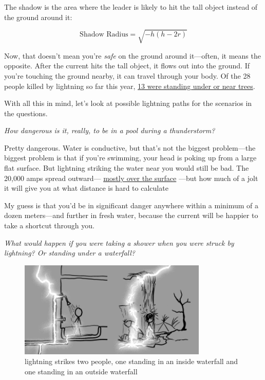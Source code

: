 {The shadow is the area where the leader is likely to hit the tall object instead of the ground around it:}

{\[\text{Shadow Radius}=\sqrt{-h(h-2r)}\]}

{Now, that doesn’t mean you’re \emph{safe} on the ground around it—often, it means the opposite. After the current hits the tall object, it flows out into the ground. If you’re touching the ground nearby, it can travel through your body. Of the 28 people killed by lightning so far this year, \href{http://www.lightningsafety.noaa.gov/fatalities.htm}{13 were standing under or near trees}.}

{With all this in mind, let’s look at possible lightning paths for the scenarios in the questions.}

{ \emph{How dangerous is it, really, to be in a pool during a thunderstorm?} }

{Pretty dangerous. Water is conductive, but that’s not the biggest problem—the biggest problem is that if you’re swimming, your head is poking up from a large flat surface. But lightning striking the water near you would still be bad. The 20,000 amps spread outward— \href{http://www.pbs.org/wgbh/nova/earth/dwyer-lightning.html}{mostly over the surface} —but how much of a jolt it will give you at what distance is hard to calculate}

{My guess is that you’d be in significant danger anywhere within a minimum of a dozen meters—and further in fresh water, because the current will be happier to take a shortcut through you.}

{ \emph{What would happen if you were taking a shower when you were struck by lightning? Or standing under a waterfall?} }

\begin{figure}[!htbp]
\centering
\includegraphics[scale=0.5, max width=0.8\textwidth]{imgs/a/16/lightning_shower.png}
\caption{lightning strikes two people, one standing in an inside waterfall and one standing in an outside waterfall}
\end{figure}

